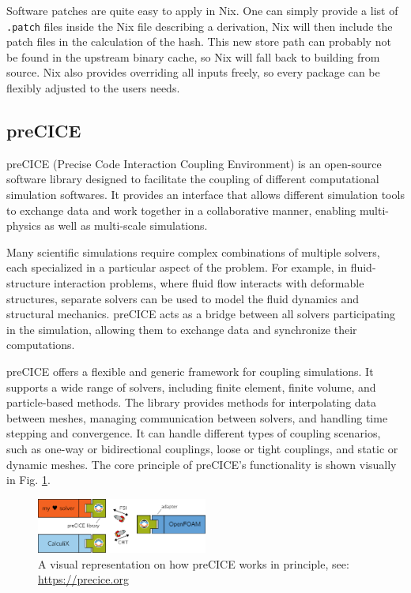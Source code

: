 \documentclass{eceasst}
\begin{document}
Software patches are quite easy to apply in Nix.
One can simply provide a list of \texttt{.patch} files inside the Nix file describing a derivation, Nix will then include the patch files in the calculation of the hash.
This new store path can probably not be found in the upstream binary cache, so Nix will fall back to building from source.
Nix also provides overriding all inputs freely, so every package can be flexibly adjusted to the users needs.


\subsection{preCICE}

preCICE (Precise Code Interaction Coupling Environment) is an open-source software library designed to facilitate the coupling of different computational simulation softwares.
It provides an interface that allows different simulation tools to exchange data and work together in a collaborative manner, enabling multi-physics as well as multi-scale simulations.

Many scientific simulations require complex combinations of multiple solvers, each specialized in a particular aspect of the problem.
For example, in fluid-structure interaction problems, where fluid flow interacts with deformable structures, separate solvers can be used to model the fluid dynamics and structural mechanics.
preCICE acts as a bridge between all solvers participating in the simulation, allowing them to exchange data and synchronize their computations.

preCICE offers a flexible and generic framework for coupling simulations.
It supports a wide range of solvers, including finite element, finite volume, and particle-based methods.
The library provides methods for interpolating data between meshes, managing communication between solvers, and handling time stepping and convergence.
It can handle different types of coupling scenarios, such as one-way or bidirectional couplings, loose or tight couplings, and static or dynamic meshes.
The core principle of preCICE's functionality is shown visually in Fig. \ref{fig:precice}.

\begin{figure}
    \centering
    \includegraphics[width=0.5\textwidth]{figures/precice.png}
    \caption{A visual representation on how preCICE works in principle, see: \url{https://precice.org}}
    \label{fig:precice}
\end{figure}
\end{document}
